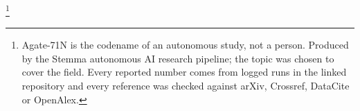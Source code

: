 \thanks{Agate-71N is the codename of an autonomous study, not a person. Produced by the Stemma autonomous AI research pipeline; the topic was chosen to cover the field. Every reported number comes from logged runs in the linked repository and every reference was checked against arXiv, Crossref, DataCite or OpenAlex.}
